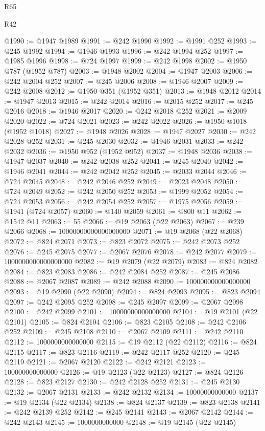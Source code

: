 \begin{lexlean}{R65}
\begin{lexlean}{R42}
\begin{coremodule}
{{{{{{{{{{{{{{{{{{{{{{{{{{{{{{{{{{{{{{{{{{{{{{{{{{{{{{{{{{{{{{{{{{{{{{{{{{{{{{{{{{{{{{{{{{{{{{{{{{{{{{{{{{{{{{{{{{{{{{{{{{{{{{{{{{{{{{{{{{{{{{{{{{{{{{{{{{{{{{{{{{{{{{{{{{{{{{{{{{{{{{{{@1990 := @1947 @1989
@1991 := @242 @1990
@1992 := @1991 @252
@1993 := @245 @1992
@1994 := @1946 @1993
@1996 := @242 @1994 @252
@1997 := @1985 @1996
@1998 := @724 @1997
@1999 := @242 @1998
@2002 := @1950 @787 (@1952 @787)
@2003 := @1948 @2002
@2004 := @1947 @2003
@2006 := @242 @2004 @252
@2007 := @245 @2006
@2008 := @1946 @2007
@2009 := @242 @2008
@2012 := @1950 @351 (@1952 @351)
@2013 := @1948 @2012
@2014 := @1947 @2013
@2015 := @242 @2014
@2016 := @2015 @252
@2017 := @245 @2016
@2018 := @1946 @2017
@2020 := @242 @2018 @252
@2021 := @2009 @2020
@2022 := @724 @2021
@2023 := @242 @2022
@2026 := @1950 @1018 (@1952 @1018)
@2027 := @1948 @2026
@2028 := @1947 @2027
@2030 := @242 @2028 @252
@2031 := @245 @2030
@2032 := @1946 @2031
@2033 := @242 @2032
@2036 := @1950 @952 (@1952 @952)
@2037 := @1948 @2036
@2038 := @1947 @2037
@2040 := @242 @2038 @252
@2041 := @245 @2040
@2042 := @1946 @2041
@2044 := @242 @2042 @252
@2045 := @2033 @2044
@2046 := @724 @2045
@2048 := @242 @2046 @252
@2049 := @2023 @2048
@2050 := @724 @2049
@2052 := @242 @2050 @252
@2053 := @1999 @2052
@2054 := @724 @2053
@2056 := @242 @2054 @252
@2057 := @1975 @2056
@2059 := @1941 (@724 @2057)
@2060 := @140 @2059
@2061 := @800 @11
@2062 := @1542 @11
@2063 := 55
@2066 := @19 @2063 (@22 @2063)
@2067 := @239 @2066
@2068 := 10000000000000000000
@2071 := @19 @2068 (@22 @2068)
@2072 := @824 @2071
@2073 := @823 @2072
@2075 := @242 @2073 @252
@2076 := @245 @2075
@2077 := @2067 @2076
@2078 := @242 @2077
@2079 := 1000000000000000000
@2082 := @19 @2079 (@22 @2079)
@2083 := @824 @2082
@2084 := @823 @2083
@2086 := @242 @2084 @252
@2087 := @245 @2086
@2088 := @2067 @2087
@2089 := @242 @2088
@2090 := 100000000000000000
@2093 := @19 @2090 (@22 @2090)
@2094 := @824 @2093
@2095 := @823 @2094
@2097 := @242 @2095 @252
@2098 := @245 @2097
@2099 := @2067 @2098
@2100 := @242 @2099
@2101 := 10000000000000000
@2104 := @19 @2101 (@22 @2101)
@2105 := @824 @2104
@2106 := @823 @2105
@2108 := @242 @2106 @252
@2109 := @245 @2108
@2110 := @2067 @2109
@2111 := @242 @2110
@2112 := 1000000000000000
@2115 := @19 @2112 (@22 @2112)
@2116 := @824 @2115
@2117 := @823 @2116
@2119 := @242 @2117 @252
@2120 := @245 @2119
@2121 := @2067 @2120
@2122 := @242 @2121
@2123 := 100000000000000
@2126 := @19 @2123 (@22 @2123)
@2127 := @824 @2126
@2128 := @823 @2127
@2130 := @242 @2128 @252
@2131 := @245 @2130
@2132 := @2067 @2131
@2133 := @242 @2132
@2134 := 10000000000000
@2137 := @19 @2134 (@22 @2134)
@2138 := @824 @2137
@2139 := @823 @2138
@2141 := @242 @2139 @252
@2142 := @245 @2141
@2143 := @2067 @2142
@2144 := @242 @2143
@2145 := 1000000000000
@2148 := @19 @2145 (@22 @2145)
}}}}}}}}}}}}}}}}}}}}}}}}}}}}}}}}}}}}}}}}}}}}}}}}}}}}}}}}}}}}}}}}}}}}}}}}}}}}}}}}}}}}}}}}}}}}}}}}}}}}}}}}}}}}}}}}}}}}}}}}}}}}}}}}}}}}}}}}}}}}}}}}}}}}}}}}}}}}}}}}}}}}}}}}}}}}}}}}}}}}}}}}
\end{coremodule}
\end{lexlean}
\end{lexlean}
